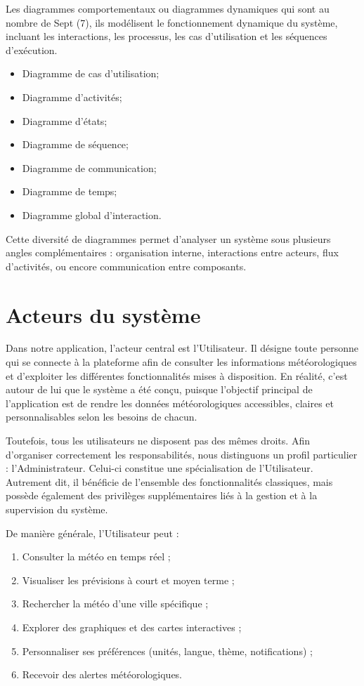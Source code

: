 Les diagrammes comportementaux ou diagrammes dynamiques qui sont au nombre de Sept (7), ils modélisent le fonctionnement dynamique du système, incluant les interactions, les processus, les cas d’utilisation et les séquences d’exécution.
\begin{itemize}
\item Diagramme de cas d'utilisation;
\item Diagramme d’activités;
\item Diagramme d'états;
\item Diagramme de séquence;
\item Diagramme de communication;
\item Diagramme de temps;
\item Diagramme global d’interaction.
\end{itemize}

Cette diversité de diagrammes permet d’analyser un système sous plusieurs angles complémentaires : organisation interne, interactions entre acteurs, flux d’activités, ou encore communication entre composants.

\section{Acteurs du système}

Dans notre application, l’acteur central est l’Utilisateur. Il désigne toute personne qui se connecte à la plateforme afin de consulter les informations météorologiques et d’exploiter les différentes fonctionnalités mises à disposition. En réalité, c’est autour de lui que le système a été conçu, puisque l’objectif principal de l’application est de rendre les données météorologiques accessibles, claires et personnalisables selon les besoins de chacun.

Toutefois, tous les utilisateurs ne disposent pas des mêmes droits. Afin d’organiser correctement les responsabilités, nous distinguons un profil particulier : l’Administrateur. Celui-ci constitue une spécialisation de l’Utilisateur. Autrement dit, il bénéficie de l’ensemble des fonctionnalités classiques, mais possède également des privilèges supplémentaires liés à la gestion et à la supervision du système.

De manière générale, l’Utilisateur peut :
\begin{enumerate}
    \item Consulter la météo en temps réel ;
    \item Visualiser les prévisions à court et moyen terme ;
    \item Rechercher la météo d’une ville spécifique ;
    \item Explorer des graphiques et des cartes interactives ;
    \item Personnaliser ses préférences (unités, langue, thème, notifications) ;
    \item Recevoir des alertes météorologiques.
\end{enumerate}

